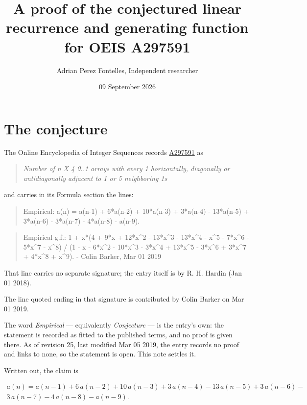 \documentclass[11pt]{article}
\title{A proof of the conjectured linear recurrence and generating function for OEIS A297591}
\author{Adrian Perez Fontelles, Independent researcher}
\date{09 September 2026}
\theoremstyle{definition}
\begin{document}
\maketitle
\section{The conjecture}

The Online Encyclopedia of Integer Sequences records \href{https://oeis.org/A297591}{A297591} as

\begin{quote}\itshape Number of n X 4 0..1 arrays with every 1 horizontally, diagonally or antidiagonally adjacent to 1 or 5 neighboring 1s\end{quote}

and carries in its Formula section the lines:

\begin{quote}\ttfamily Empirical: a(n) = a(n-1) + 6*a(n-2) + 10*a(n-3) + 3*a(n-4) - 13*a(n-5) + 3*a(n-6) - 3*a(n-7) - 4*a(n-8) - a(n-9).\end{quote}

\begin{quote}\ttfamily Empirical g.f.: 1 + x*(4 + 9*x + 12*x\textasciicircum{}2 - 13*x\textasciicircum{}3 - 13*x\textasciicircum{}4 - x\textasciicircum{}5 - 7*x\textasciicircum{}6 - 5*x\textasciicircum{}7 - x\textasciicircum{}8) / (1 - x - 6*x\textasciicircum{}2 - 10*x\textasciicircum{}3 - 3*x\textasciicircum{}4 + 13*x\textasciicircum{}5 - 3*x\textasciicircum{}6 + 3*x\textasciicircum{}7 + 4*x\textasciicircum{}8 + x\textasciicircum{}9). - Colin Barker, Mar 01 2019\end{quote}

That line carries no separate signature; the entry itself is by R. H. Hardin (Jan 01 2018).

The line quoted ending in that signature is contributed by Colin Barker on Mar 01 2019.

The word {\itshape Empirical} --- equivalently {\itshape Conjecture} --- is the entry's own: the statement is recorded as fitted to the published terms, and no proof is given there. As of revision 25, last modified Mar 05 2019, the entry records no proof and links to none, so the statement is open. This note settles it.

Written out, the claim is

\begin{multline*} a(n) = a(n-1) + 6\,a(n-2) + 10\,a(n-3) + 3\,a(n-4) - 13\,a(n-5) + 3\,a(n-6) - \\ 3\,a(n-7) - 4\,a(n-8) - a(n-9). \end{multline*}
\end{document}
